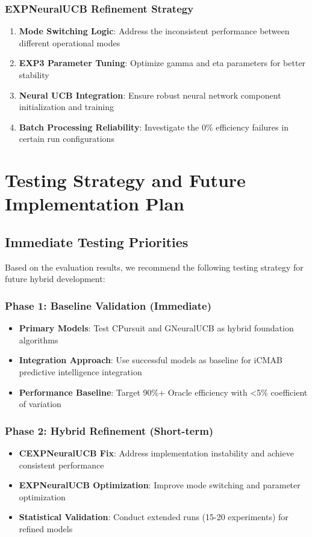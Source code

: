 \documentclass[12pt,a4paper]{article}
\begin{document}
\subsubsection{EXPNeuralUCB Refinement Strategy}

\begin{enumerate}
\item \textbf{Mode Switching Logic}: Address the inconsistent performance between different operational modes
\item \textbf{EXP3 Parameter Tuning}: Optimize gamma and eta parameters for better stability
\item \textbf{Neural UCB Integration}: Ensure robust neural network component initialization and training
\item \textbf{Batch Processing Reliability}: Investigate the 0\% efficiency failures in certain run configurations
\end{enumerate}

\section{Testing Strategy and Future Implementation Plan}

\subsection{Immediate Testing Priorities}

Based on the evaluation results, we recommend the following testing strategy for future hybrid development:

\subsubsection{Phase 1: Baseline Validation (Immediate)}
\begin{itemize}
\item \textbf{Primary Models}: Test CPursuit and GNeuralUCB as hybrid foundation algorithms
\item \textbf{Integration Approach}: Use successful models as baseline for iCMAB predictive intelligence integration
\item \textbf{Performance Baseline}: Target 90\%+ Oracle efficiency with <5\% coefficient of variation
\end{itemize}

\subsubsection{Phase 2: Hybrid Refinement (Short-term)}
\begin{itemize}
\item \textbf{CEXPNeuralUCB Fix}: Address implementation instability and achieve consistent performance
\item \textbf{EXPNeuralUCB Optimization}: Improve mode switching and parameter optimization
\item \textbf{Statistical Validation}: Conduct extended runs (15-20 experiments) for refined models
\end{itemize}
\end{document}
